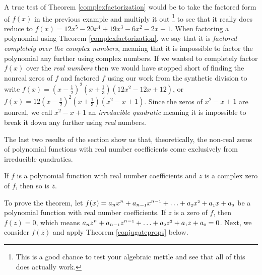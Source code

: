 \documentclass{ximera}
\begin{document}
A true test of Theorem \ref{complexfactorization} would be to take the factored form of $f(x)$ in the previous example and multiply it out%
\footnote{This is a good chance to test your algebraic mettle and see that all of this does actually work.} 
to see that it really does reduce to  $f(x) = 12x^5 - 20x^4+19x^3-6x^2-2x+1$.  When factoring a polynomial using Theorem \ref{complexfactorization}, we say that it is  \emph{factored completely over the complex numbers}, meaning that it is impossible to factor the polynomial any further using complex numbers.  If we wanted to   completely factor $f(x)$ over the \emph{real numbers} then we would have stopped short of finding the nonreal zeros of $f$ and factored $f$ using our work from the synthetic division to write $f(x) = \left(x - \frac{1}{2} \right)^2 \left(x + \frac{1}{3} \right)\left(12x^2 - 12x + 12\right)$, or $f(x) = 12\left(x - \frac{1}{2} \right)^2 \left(x + \frac{1}{3} \right)\left(x^2 - x + 1\right)$.  Since the zeros of $x^2-x+1$ are nonreal, we call $x^2-x+1$ an \emph{irreducible quadratic} meaning it is impossible to break it down any further using \emph{real} numbers.  


The last two results of the section show us that, theoretically, the non-real zeros of polynomial functions with real number coefficients come exclusively from irreducible quadratics.

\begin{theorem} 
    \label{conjugatepairsthm}
    If $f$ is a polynomial function with real number coefficients and $z$ is a complex zero of $f$, then so is $\overline{z}$. 
\end{theorem}


To prove the theorem, let $ f(x) = a_{n} x^{n} + a_{n-\mbox{\tiny$1$}} x^{n-\mbox{\tiny$1$}} + \ldots + a_{\mbox{\tiny $2$}} x^{\mbox{\tiny $2$}} + a_{\mbox{\tiny $1$}} x + a_{\mbox{\tiny $0$}}$ be a polynomial function with real number coefficients.  If $z$ is a zero of $f$, then $f(z) = 0$, which means $a_{n} z^{n} + a_{n-\mbox{\tiny$1$}} z^{n-\mbox{\tiny$1$}} + \ldots + a_{\mbox{\tiny $2$}} z^{\mbox{\tiny $2$}} + a_{\mbox{\tiny $1$}} z + a_{\mbox{\tiny $0$}} = 0$.  Next, we consider $f\left(\overline{z}\right)$ and apply Theorem \ref{conjugateprops} below.
\end{document}
